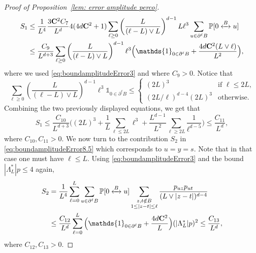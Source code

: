 \documentclass[11pt,a4paper]{article}
\numberwithin{equation}{section}
\theoremstyle{plain}
\theoremstyle{definition}
\newcommand\bfC{\mathbf{C}}
\newcommand{\connect}{\xleftrightarrow}
\begin{document}
\begin{proof}[Proof of Proposition~\textup{\ref{lem: error amplitude perco}}]
\begin{align}\notag
	S_1&\leq \frac{1}{L^4}\frac{3\bfC^2C_7}{L^d}4(4d\bfC^2+1)\sum_{\ell\geq 0}\left(\frac{L}{(\ell-L)\vee L}\right)^{d-1}L\ell^3 \sum_{u\in \partial^\ell B}\mathbb P[0\connect{B\:}u]\\&\leq \frac{C_9}{L^{d+3}}\sum_{\ell \geq 0}\left(\frac{L}{(\ell-L)\vee L}\right)^{d-1}\ell^3 \Big(\mathds{1}_{0\in \partial^\ell B}+\frac{4d\bfC^2(L\vee \ell)}{L^2}\Big),
\end{align}
where we used \eqref{eq:boundamplitudeError3} and where $C_9>0$. Notice that 
\begin{equation}\label{eq: bound contribution 0 in partial l}
	\sum_{\ell \geq 0}\left(\frac{L}{(\ell-L)\vee L}\right)^{d-1}\ell^3 \mathds{1}_{0\in \partial^\ell B}\leq \left\{
    \begin{array}{ll}
        (2L)^3 & \mbox{if } \ell\leq 2L,\\
        (2L/\ell)^{d-4}(2L)^3 & \mbox{otherwise}.
    \end{array}
\right.
\end{equation}
Combining the two previously displayed equations, we get that
\begin{equation}\label{eq:boundS1}
	S_1\leq \frac{C_{10}}{L^{d+3}}\Big( (2L)^3+ \frac{1}{L}\sum_{\ell \leq 2L}\ell^3+\frac{L^{d-1}}{L^2}\sum_{\ell\geq 2L}\frac{1}{\ell^{d-5}}\Big)\leq\frac{C_{11}}{L^d},
\end{equation}
where $C_{10},C_{11}>0$. We now turn to the contribution $S_2$ in \eqref{eq:boundamplitudeError8.5} which corresponds to $u=y=s$. Note that in that case one must have $\ell \leq L$. Using \eqref{eq:boundamplitudeError3} and the bound $|\Lambda_L^*|p\leq 4$ again,
\begin{align}\notag
	S_2&=\frac{1}{L^4}\sum_{\ell=0}^L\sum_{u\in \partial^\ell B}\mathbb P[0\connect{B\:}u]\sum_{\substack{z,t\notin B\\1\leq |z-t|\leq \ell}}\frac{p_{uz}p_{ut}}{(L\vee|z-t|)^{d-4}}\\&\leq \frac{C_{12}}{L^d}\sum_{\ell=0}^L\Big(\mathds{1}_{0\in \partial^\ell B}+\frac{4d\bfC^2}{L}\Big)(|\Lambda_L^*|p)^2\leq \frac{C_{13}}{L^d},\label{eq:boundS2}
\end{align}
where $C_{12},C_{13}>0$.


\end{proof}
\end{document}

